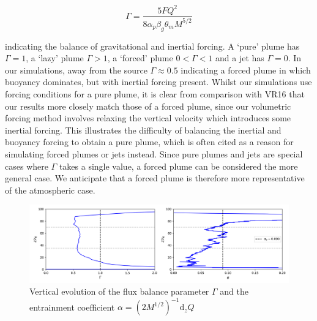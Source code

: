\documentclass[a4paper]{article}
\begin{document}
\begin{equation}
	\Gamma = \frac{5FQ^2}{8\alpha_p \beta_g \theta_m M^{5/2}}
	\label{eq:rich}
\end{equation}

indicating the balance of gravitational and inertial forcing. A `pure' plume has $\Gamma = 1$, a `lazy' plume
$\Gamma > 1$, a `forced' plume $0 < \Gamma < 1$ and a jet has $\Gamma = 0$. In our simulations, away from the
source $\Gamma \approx 0.5$ indicating a forced plume in which buoyancy dominates, but with inertial forcing
present. Whilst our simulations use forcing conditions for a pure plume, it is clear from comparison with VR16
that our results more closely match those of a forced plume, since our volumetric forcing method involves
relaxing the vertical velocity which introduces some inertial forcing. This illustrates the difficulty of
balancing the inertial and buoyancy forcing to obtain a pure plume, which is often cited as a reason for
simulating forced plumes or jets instead. Since pure plumes and jets are special cases where $\Gamma$ takes a
single value, a forced plume can be considered the more general case. We anticipate that a forced plume is
therefore more representative of the atmospheric case.

\begin{figure}
	\centering
	\includegraphics[width=\textwidth]{mvr/fig8}
	\caption{Vertical evolution of the flux balance parameter $\Gamma$ and the entrainment coefficient
	$\alpha = (2M^{1/2})^{-1} \mathrm{d}_z Q$}
	\label{fig:entrain}
\end{figure}
\end{document}
